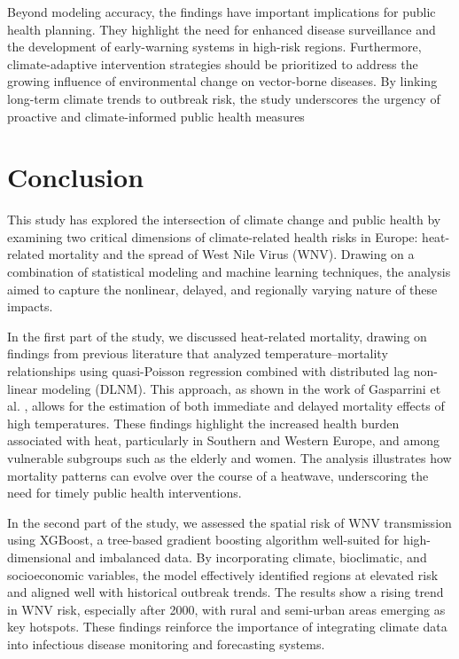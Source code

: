 \documentclass[
]{krantz}
\begin{document}
Beyond modeling accuracy, the findings have important implications for public health planning. They highlight the need for enhanced disease surveillance and the development of early-warning systems in high-risk regions. Furthermore, climate-adaptive intervention strategies should be prioritized to address the growing influence of environmental change on vector-borne diseases. By linking long-term climate trends to outbreak risk, the study underscores the urgency of proactive and climate-informed public health measures

\section{Conclusion}\label{conclusion-2}

This study has explored the intersection of climate change and public health by examining two critical dimensions of climate-related health risks in Europe: heat-related mortality and the spread of West Nile Virus (WNV). Drawing on a combination of statistical modeling and machine learning techniques, the analysis aimed to capture the nonlinear, delayed, and regionally varying nature of these impacts.

In the first part of the study, we discussed heat-related mortality, drawing on findings from previous literature that analyzed temperature--mortality relationships using quasi-Poisson regression combined with distributed lag non-linear modeling (DLNM). This approach, as shown in the work of Gasparrini et al. \citep{gasparrini2015}, allows for the estimation of both immediate and delayed mortality effects of high temperatures. These findings highlight the increased health burden associated with heat, particularly in Southern and Western Europe, and among vulnerable subgroups such as the elderly and women. The analysis illustrates how mortality patterns can evolve over the course of a heatwave, underscoring the need for timely public health interventions.

In the second part of the study, we assessed the spatial risk of WNV transmission using XGBoost, a tree-based gradient boosting algorithm well-suited for high-dimensional and imbalanced data. By incorporating climate, bioclimatic, and socioeconomic variables, the model effectively identified regions at elevated risk and aligned well with historical outbreak trends. The results show a rising trend in WNV risk, especially after 2000, with rural and semi-urban areas emerging as key hotspots. These findings reinforce the importance of integrating climate data into infectious disease monitoring and forecasting systems.
\end{document}
